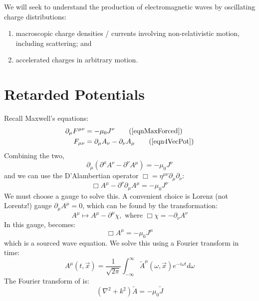 \documentclass[../Main.tex]{subfiles}
\begin{document}
We will seek to understand the production of electromagnetic waves by oscillating charge distributions:
\begin{enumerate}
    \item macroscopic charge densities / currents involving non-relativistic motion, including scattering; and
    \item accelerated charges in arbitrary motion.
\end{enumerate}
\section{Retarded Potentials}
Recall Maxwell's equations:
\begin{align*}
    \partial_\mu F^{\mu\nu} &= -\mu_0 J^\nu \tag{\ref{eqnMaxForced}} \\
    F_{\mu\nu} &= \partial_\mu A_\nu - \partial_\nu A_\mu \tag{\ref{eqn4VecPot}}
\end{align*}
Combining the two,
\begin{equation*}
    \partial_\mu \left(\partial^\mu A^\nu - \partial^\nu A^\mu\right) = -\mu_0 J^\nu
\end{equation*}
and we can use the D'Alambertian operator $\Box = \eta^{\mu\nu} \partial_\mu \partial_\nu$:
\begin{equation}
    \Box A^\mu - \partial^\nu \partial_\mu A^\mu = -\mu_0 J^\nu
    \label{eqnDAlamBadGauge}
\end{equation}
We must choose a gauge to solve this. A convenient choice is Lorenz (not Lorentz!) gauge $\partial_\mu A^\mu = 0$, which can be found by the transformation:
\begin{equation*}
    A^\mu \mapsto A^\mu - \partial^\mu \chi, \text{ where } \Box \chi = - \partial_\nu A^\nu
\end{equation*}
In this gauge,  becomes:
\begin{equation}
    \Box A^\mu = -\mu_0 J^\mu
    \label{eqnDAlam}
\end{equation}
which is a sourced wave equation. We solve this using a Fourier transform in time:
\begin{equation*}
    A^\mu (t, \vec{x}) = \frac1{\sqrt{2\pi}} \int_{-\infty}^{\infty} \tilde{A}^\mu (\omega, \vec{x}) e^{-i\omega t} d\omega 
\end{equation*}
The Fourier transform of  is:
\begin{equation*}
    (\nabla^2 + k^2) \tilde{A} = -\mu_0 \tilde{J}
\end{equation*}
\end{document}
